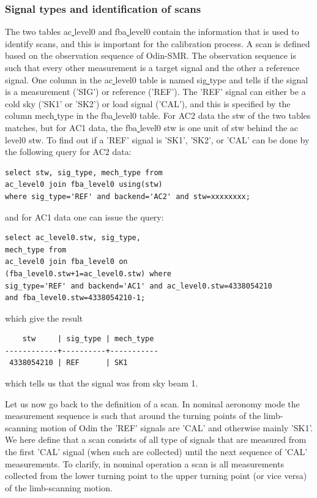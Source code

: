 \documentclass[12pt]{article}
\begin{document}
\subsubsection{Signal types and identification of scans}
\label{sec:scanid}
The two tables ac\underline{ }level0 and fba\underline{ }level0
contain the information that is used to identify scans,
and this is important for the calibration process.
A scan is defined based on the observation sequence of Odin-SMR.
The observation sequence is such that every other measurement
is a target signal and the other a reference signal.
One column in the ac\underline{ }level0
table is named sig\underline{ }type and tells if the signal is 
a measurement ('SIG') or reference ('REF').
The 'REF' signal can either be a cold sky ('SK1' or 'SK2') or load 
signal ('CAL'), and this is specified by the column 
mech\underline{ }type in the fba\underline{ }level0 table.
For AC2 data the stw of the two tables matches, but for
 AC1 data, the fba\underline{ }level0 stw is one unit of stw
behind  the ac\underline{ }level0 stw.
To find out if a 'REF' signal is 'SK1', 'SK2', or 'CAL'
can be done by the following query  for AC2 data:
\begin{verbatim}
select stw, sig_type, mech_type from 
ac_level0 join fba_level0 using(stw) 
where sig_type='REF' and backend='AC2' and stw=xxxxxxxx;
\end{verbatim}
and for AC1 data one can issue the query:
\begin{verbatim}
select ac_level0.stw, sig_type,
mech_type from 
ac_level0 join fba_level0 on 
(fba_level0.stw+1=ac_level0.stw) where 
sig_type='REF' and backend='AC1' and ac_level0.stw=4338054210
and fba_level0.stw=4338054210-1;
\end{verbatim}
which give the result
\begin{verbatim}
    stw     | sig_type | mech_type 
------------+----------+-----------
 4338054210 | REF      | SK1
\end{verbatim}
which tells us that the signal was from sky beam 1.

Let us now go back to the definition of a scan.
In nominal aeronomy mode the measurement sequence
is such that around the turning points of the limb-scanning
motion of Odin the 'REF' signals are 'CAL' and otherwise mainly
'SK1'. We here define that a scan consists of all type of signals
that are measured from the first 'CAL' signal
(when such are collected)
until the next sequence of 'CAL' measurements. 
To clarify, in nominal operation a scan is all measurements collected 
from the lower
turning point to the upper turning point (or vice versa)
of the limb-scanning motion.  
\end{document}
